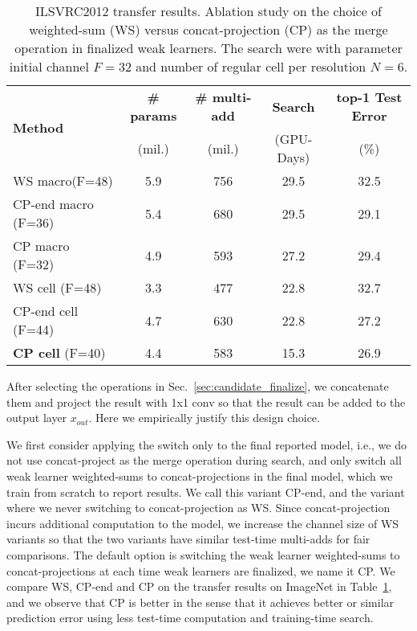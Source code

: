 \begin{table}[t]
    \centering
    \caption{ILSVRC2012 transfer results. 
    	Ablation study on the choice of weighted-sum (WS) versus concat-projection (CP) as the merge operation in finalized weak learners.
    	The search were with parameter initial channel $F=32$ and number of regular cell per resolution $N=6$. 
    }
    \begin{tabular}{l|cccc}
    \hline
\multirow{ 2}{*}{\textbf{Method} }
        &  \textbf{\# params} 
        &  \textbf{\# multi-add}
        &  \textbf{Search}
        &  \textbf{top-1 Test Error } \\
        &  (mil.)
        &  (mil.)
        &  (GPU-Days)
        &  (\%)\\
\hline
WS macro(F=48) %
    & 5.9 & 756 & 29.5 & 32.5\\
CP-end macro (F=36) %
    & 5.4 & 680 & 29.5 & 29.1 \\
{CP macro} (F=32) %
    & 4.9 & 593 & 27.2 & 29.4 \\
\hline
WS cell (F=48) %
    & 3.3 & 477 & 22.8 & 32.7\\
CP-end cell  (F=44) %
    & 4.7 & 630 & 22.8 & 27.2 \\
\textbf{CP cell} (F=40) %
    & 4.4 & 583 & 15.3 &  26.9 \\
\hline  
\end{tabular}
\label{tab:imagenet_ws_vs_cp}
\end{table}



After selecting the operations in Sec.~\ref{sec:candidate_finalize}, we concatenate them and project the result with 1x1 conv so that the result can be added to the output layer $x_{out}$. 
Here we empirically justify this design choice.

We first consider applying the switch only to the final reported model, i.e., we do not use concat-project as the merge operation during search, and only switch all weak learner weighted-sums to concat-projections in the final model, which we train from scratch to report results. We call this variant CP-end, and the variant where we never switching to concat-projection as WS. Since concat-projection incurs additional computation to the model, we increase the channel size of WS variants so that the two variants have similar test-time multi-adds for fair comparisons. The default \Petridish option is switching the weak learner weighted-sums to concat-projections at each time weak learners are finalized, we name it CP. We compare WS, CP-end and CP on the transfer results on ImageNet in  Table~\ref{tab:imagenet_ws_vs_cp}, and we observe that CP is better in the sense that it achieves better or similar prediction error using less test-time computation and training-time search. 



